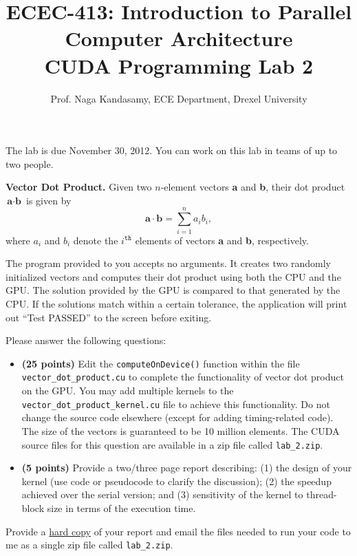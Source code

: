 \documentclass[11.5pt]{article}
\begin{document}
\title{ECEC-413: Introduction to Parallel Computer Architecture \\
CUDA Programming Lab 2}
\author{Prof. Naga Kandasamy, ECE Department, Drexel University}
\maketitle %
\date{}

\noindent The lab is due November 30, 2012. You can work on this lab in teams of up to two people.
\vspace{12pt}

\noindent \textbf{Vector Dot Product.} Given two $n$-element vectors \textbf{a} and \textbf{b}, their dot product $\textbf{a} \cdot \textbf{b}$ is given by
\begin{equation*}
\textbf{a} \cdot \textbf{b} = \sum_{i = 1}^{n}a_ib_i,
\end{equation*}
\noindent where $a_i$ and $b_i$ denote the $i^{\texttt{th}}$ elements of vectors \textbf{a} and \textbf{b}, respectively. \vspace{6pt}

\noindent The program provided to you accepts no arguments. It creates two randomly initialized vectors and computes their dot product using both the CPU and the GPU. The solution provided by the GPU is compared to that generated by the CPU. If the solutions match within a certain tolerance, the application will print out ``Test PASSED'' to the screen before exiting. \vspace{6pt}

\noindent Please answer the following questions:
\begin{itemize}
\item \textbf{(25 points)} Edit the \texttt{computeOnDevice()} function within the file \texttt{vector\_dot\_product.cu} to complete the functionality of vector dot product on the GPU. You may add multiple kernels to the \texttt{vector\_dot\_product\_kernel.cu} file to achieve this functionality. Do not change the source code elsewhere (except for adding timing-related code). The size of the vectors is guaranteed to be 10 million elements. The CUDA source files for this question are available in a zip file called \texttt{lab\_2.zip}.

\item \textbf{(5 points)} Provide a two/three page report describing: (1) the design of your kernel (use code or pseudocode to clarify the discussion); (2) the speedup achieved over the serial version; and (3) sensitivity of the kernel to thread-block size in terms of the execution time.
\end{itemize}

\noindent Provide a \underline{hard copy} of your report and email the files needed to run your code to me as a single zip file called \texttt{lab\_2.zip}.
\end{document}
